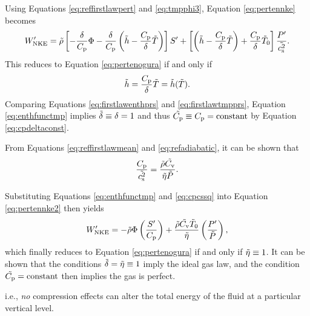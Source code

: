 \documentclass[12pt]{article}
\newcommand{\wpnke}{W^\prime_{\rm NKE}}
\begin{document}
Using Equations \eqref{eq:reffirstlawpert} and \eqref{eq:tmpphi3}, Equation \eqref{eq:pertennke} becomes
\begin{align}\label{eq:pertennke2}
	\wpnke = \rhotilde\left[-\frac{\delta}{\cpcap}\Phi - \frac{\delta}{\cpcap}\left(\enthtilde - \frac{\cpcap}{\delta}\tmptilde\right)\right] \entrprime +\left[\left(\enthtilde-\frac{\cpcap}{\delta}\tmptilde\right) + \frac{\cpcap}{\delta}\tmptilde_0\right]\frac{\prsprime}{\cssqtilde}.
\end{align}
This reduces to Equation \eqref{eq:pertenogura} if and only if 
\begin{align}\label{eq:enthfunctmp}
	\tilde{h} = \frac{C_{\rm{p}}}{\delta}\tilde{T} = \tilde{h}(\tilde{T}). 
\end{align}
Comparing Equations \eqref{eq:firstlawenthprs} and \eqref{eq:firstlawtmpprs}, Equation \eqref{eq:enthfunctmp} implies $\tilde{\delta}\equiv\delta=1$ and thus $\tilde{C_{\rm{p}}}\equiv C_{\rm{p}}=\text{constant}$ by Equation \eqref{eq:cpdeltaconst}.  

From Equations \eqref{eq:reffirstlawmean} and \eqref{eq:refadiabatic}, it can be shown that
\begin{align}\label{eq:cpcssq}
	\frac{C_{\rm{p}}}{\tilde{c_{\rm s}^2}} = \frac{\tilde{\rho}\tilde{C_{\rm{v}}}}{\tilde{\eta}\tilde{P}}.
\end{align}

Substituting Equations \eqref{eq:enthfunctmp} and \eqref{eq:cpcssq} into Equation \eqref{eq:pertennke2} then yields
\begin{align}\label{eq:pertennke3}
	\wpnke =-\rhotilde\Phi\left(\frac{\entrprime}{\cpcap}\right) + \frac{\rhotilde\cvtilde\tmptilde_0}{\etatilde}\left(\frac{\prsprime}{\prstilde}\right),
\end{align}
which finally reduces to Equation \eqref{eq:pertenogura} if and only if $\tilde{\eta}\equiv1$. It can be shown that the conditions $\tilde{\delta}=\tilde{\eta}\equiv1$ imply the ideal gas law, and the condition $\tilde{C_{\rm{p}}}=\text{constant}$ then implies the gas is perfect.
 
i.e., \textit{no} compression effects can alter the total energy of the fluid at a particular vertical level.
\end{document}
